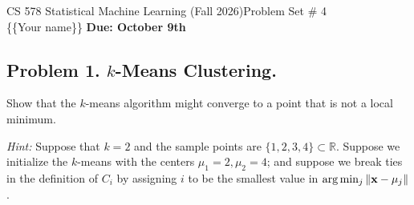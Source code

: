 \documentclass[12pt]{article}
\theoremstyle{plain}
\theoremstyle{definition}
\newcommand{\R}{\mathbb{R}}
\begin{document}
\noindent CS 578 Statistical Machine Learning (Fall 2026)\hfill Problem Set \# 4\\
\{\{Your name\}\} \hfill \textbf{Due: October 9th}

\noindent\hrulefill

\subsection*{Problem 1. $k$-Means Clustering.}
Show that the $k$-means algorithm might converge to a point that is not a local minimum. 

\emph{Hint:} Suppose that $k = 2$ and the sample points are $\{1,2,3,4\}\subset \R$. Suppose we initialize the $k$-means with the centers $\mu_1=2, \mu_2=4$; and suppose we break ties in the definition of $C_i$ by assigning $i$ to be the smallest value in $\arg \min_j \|{\bf x}-{\bf \mu}_j\|$.

\vspace{1em}
\newline 
\   %
\newpage
\end{document}
